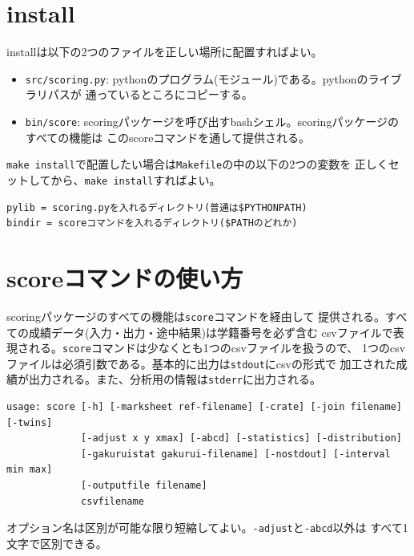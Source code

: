 \section{install}
\label{install}

installは以下の2つのファイルを正しい場所に配置すればよい。

\begin{itemize}
\item \texttt{src\slash scoring.py}: pythonのプログラム(モジュール)である。pythonのライブラリパスが
通っているところにコピーする。

\item \texttt{bin\slash score}: scoringパッケージを呼び出すbashシェル。scoringパッケージのすべての機能は
このscoreコマンドを通して提供される。

\end{itemize}

\texttt{make install}で配置したい場合は\texttt{Makefile}の中の以下の2つの変数を
正しくセットしてから、\texttt{make install}すればよい。

\begin{verbatim}
pylib = scoring.pyを入れるディレクトリ(普通は$PYTHONPATH)
bindir = scoreコマンドを入れるディレクトリ($PATHのどれか)
\end{verbatim}

\section{scoreコマンドの使い方}
\label{scoreコマンドの使い方}

scoringパッケージのすべての機能は\texttt{score}コマンドを経由して
提供される。すべての成績データ(入力・出力・途中結果)は学籍番号を必ず含む
csvファイルで表現される。\texttt{score}コマンドは少なくとも1つのcsvファイルを扱うので、
1つのcsvファイルは必須引数である。基本的に出力は\texttt{stdout}にcsvの形式で
加工された成績が出力される。また、分析用の情報は\texttt{stderr}に出力される。
\begin{tcolorbox}[enhanced jigsaw,breakable,colframe=\mycolor ,colback=white,colbacktitle=\mycolor ,coltitle=white,fonttitle=\bfseries\sffamily,title=\texttt{\$ score -h}]

\begin{verbatim}
usage: score [-h] [-marksheet ref-filename] [-crate] [-join filename] [-twins]
             [-adjust x y xmax] [-abcd] [-statistics] [-distribution]
             [-gakuruistat gakurui-filename] [-nostdout] [-interval min max]
             [-outputfile filename]
             csvfilename
\end{verbatim}

\end{tcolorbox}
オプション名は区別が可能な限り短縮してよい。\texttt{-adjust}と\texttt{-abcd}以外は
すべて1文字で区別できる。

